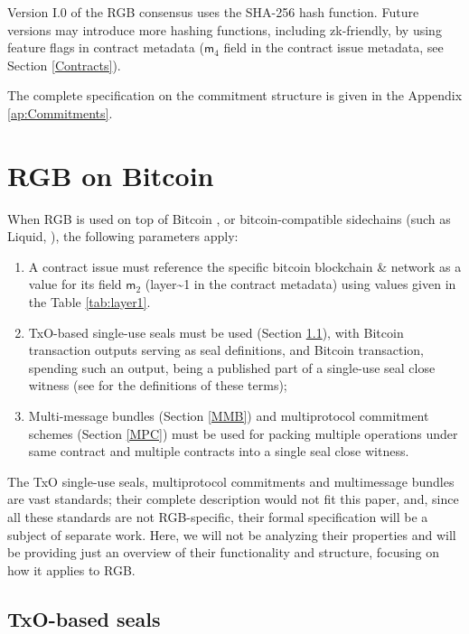 \documentclass[9pt,oneside]{amsart}
\begin{document}
\begin{multicols}{2}
Version I.0 of the RGB consensus uses the SHA-256 hash function.
Future versions may introduce more hashing functions, including zk-friendly,
by using feature flags in contract metadata
($\mathsf{m}_4$ field in the contract issue metadata, see Section \ref{Contracts}).

The complete specification on the commitment structure is given in the Appendix \ref{ap:Commitments}.

\section{RGB on Bitcoin}

When RGB is used on top of Bitcoin \cite{Bitcoin},
or bitcoin-compatible sidechains (such as Liquid, \cite{Liquid}),
the following parameters apply:

\begin{enumerate}
\item A contract \gls{issue} must reference the specific bitcoin blockchain \& network
  as a value for its field $\mathsf{m}_2$ (\gls{layer~1} in the contract metadata)
  using values given in the Table \ref{tab:layer1}.
\item TxO-based single-use seals must be used (Section \ref{Seals}),
  with Bitcoin transaction outputs serving as seal definitions,
  and Bitcoin transaction, spending such an output,
  being a published part of a single-use \gls{seal close witness}
  (see \cite{LNPBP8} for the definitions of these terms);
\item Multi-message bundles (Section \ref{MMB})
  and multiprotocol commitment schemes (Section \ref{MPC}) must be used for packing
  multiple operations under same contract and multiple contracts
  into a single \gls{seal close witness}.
\end{enumerate}

The TxO single-use seals, multiprotocol commitments and multimessage bundles are vast standards;
their complete description would not fit this paper, and,
since all these standards are not RGB-specific,
their formal specification will be a subject of separate work.
Here, we will not be analyzing their properties and will be providing just an overview
of their functionality and structure, focusing on how it applies to RGB.

\subsection{TxO-based seals}\label{Seals}


\end{multicols}
\end{document}
